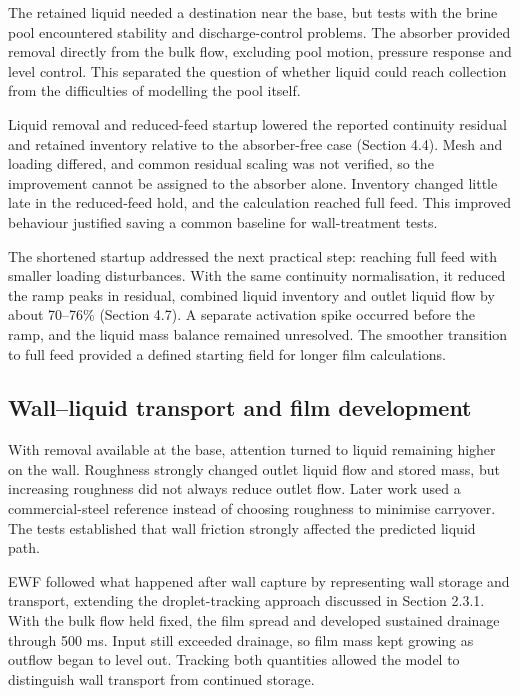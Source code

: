 \documentclass[12pt]{article}
\begin{document}
The retained liquid needed a destination near the base, but tests with the brine pool encountered stability and discharge-control problems. The absorber provided removal directly from the bulk flow, excluding pool motion, pressure response and level control. This separated the question of whether liquid could reach collection from the difficulties of modelling the pool itself.

Liquid removal and reduced-feed startup lowered the reported continuity residual and retained inventory relative to the absorber-free case (Section 4.4). Mesh and loading differed, and common residual scaling was not verified, so the improvement cannot be assigned to the absorber alone. Inventory changed little late in the reduced-feed hold, and the calculation reached full feed. This improved behaviour justified saving a common baseline for wall-treatment tests.

The shortened startup addressed the next practical step: reaching full feed with smaller loading disturbances. With the same continuity normalisation, it reduced the ramp peaks in residual, combined liquid inventory and outlet liquid flow by about 70--76\% (Section 4.7). A separate activation spike occurred before the ramp, and the liquid mass balance remained unresolved. The smoother transition to full feed provided a defined starting field for longer film calculations.

\subsection{Wall--liquid transport and film development}\label{wallliquid-transport-and-film-development}

With removal available at the base, attention turned to liquid remaining higher on the wall. Roughness strongly changed outlet liquid flow and stored mass, but increasing roughness did not always reduce outlet flow. Later work used a commercial-steel reference instead of choosing roughness to minimise carryover. The tests established that wall friction strongly affected the predicted liquid path.

EWF followed what happened after wall capture by representing wall storage and transport, extending the droplet-tracking approach discussed in Section 2.3.1. With the bulk flow held fixed, the film spread and developed sustained drainage through 500 ms. Input still exceeded drainage, so film mass kept growing as outflow began to level out. Tracking both quantities allowed the model to distinguish wall transport from continued storage.
\end{document}
